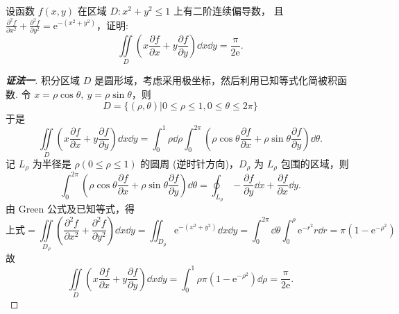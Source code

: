 \begin{example}
    设函数 $f(x,y)$ 在区域 $D:x^2+y^2\leqslant  1$ 上有二阶连续偏导数，
    且 $\displaystyle\frac{\partial^2f}{\partial x^2}+\frac{\partial^2f}{\partial y^2}=\mathrm{e}^{-\left(x^2+y^2\right)}$，证明:
    $$\iint\limits_D\left(x\frac{\partial f}{\partial x}+y\frac{\partial f}{\partial y}\right)\dd x\dd y=\frac{\pi}{2\mathrm{e}}.$$
\end{example}
\begin{proof}[{\songti \textbf{证法一}}]
    积分区域 $D$ 是圆形域，考虑采用极坐标，然后利用已知等式化简被积函数.
    令 $x=\rho\cos\theta,~y=\rho\sin\theta$，则$$D=\{(\rho,\theta)|0\leqslant \rho\le1,0\leqslant \theta\le2\pi\}$$ 于是
    $$\iint\limits_D\left(x\frac{\partial f}{\partial x}+y\frac{\partial f}{\partial y}\right)\dd x\dd y=\int_0^1\rho\dd \rho\int_0^{2\pi}\left(\rho\cos\theta\frac{\partial f}{\partial x}+\rho\sin\theta\frac{\partial f}{\partial y}\right)\dd \theta.$$
    记 $L_\rho$ 为半径是 $\rho\left(0\leqslant \rho\leqslant  1\right)$ 的圆周 (逆时针方向)，$D_\rho$ 为 $L_\rho$ 包围的区域，则
    $$\int_0^{2\pi}\left(\rho\cos\theta\frac{\partial f}{\partial x}+\rho\sin\theta\frac{\partial f}{\partial y}\right)\dd \theta=\oint_{L_\rho}-\frac{\partial f}{\partial y}\dd x+\frac{\partial f}{\partial x}\dd y.$$
    由 Green 公式及已知等式，得
    $$\text{上式}=\iint\limits_{D_\rho}\left(\frac{\partial^2f}{\partial x^2}+\frac{\partial ^2f}{\partial y^2}\right)\dd x\dd y=\iint_{D_\rho}\mathrm{e}^{-\left(x^2+y^2\right)}\dd x\dd y=\int_0^{2\pi}\dd \theta\int_0^\rho\mathrm{e}^{-r^2}r\dd r=\pi\left(1-\mathrm{e}^{-\rho^2}\right)$$
    故 $$\iint\limits_D\left(x\frac{\partial f}{\partial x}+y\frac{\partial f}{\partial y}\right)\dd x\dd y=\int_0^1\rho\pi\left(1-\mathrm{e}^{-\rho^2}\right)\dd \rho=\frac{\pi}{2\mathrm{e}}.$$
\end{proof}

